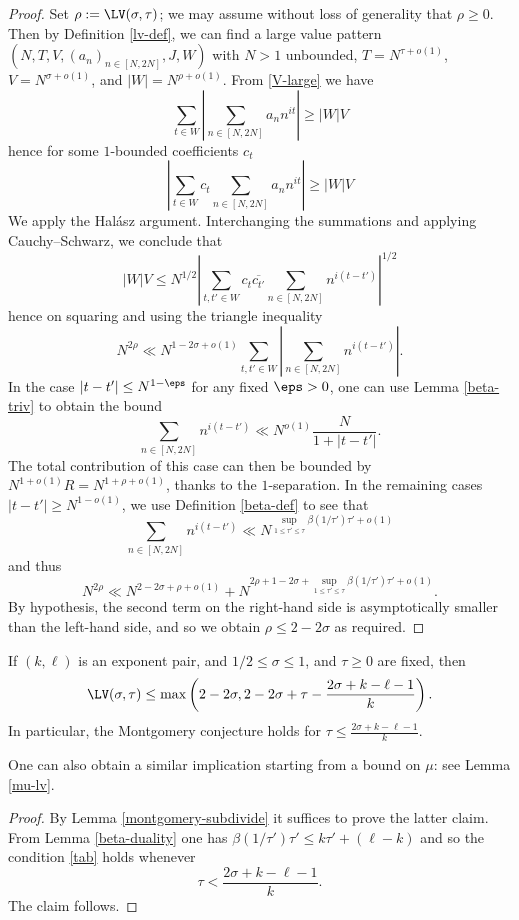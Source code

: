 \begin{proof}  Set $\rho := \LV(\sigma,\tau)$; we may assume without loss of generality that $\rho \geq 0$.  Then by Definition \ref{lv-def}, we can find a large value pattern $(N,T,V,(a_n)_{n \in [N,2N]},J,W)$  with $N > 1$ unbounded, $T = N^{\tau + o(1)}$, $V = N^{\sigma + o(1)}$, and $|W| = N^{\rho+o(1)}$.  From \eqref{V-large} we have
$$ \sum_{t \in W} \left|\sum_{n \in [N,2N]} a_n n^{it} \right| \geq |W|V$$
hence for some $1$-bounded coefficients $c_t$
$$ \left|\sum_{t \in W} c_t \sum_{n \in [N,2N]} a_n n^{it} \right| \geq |W|V$$
We apply the Hal\'asz argument. Interchanging the summations and applying Cauchy--Schwarz, we conclude that
$$ |W|V \leq N^{1/2} \left|\sum_{t, t' \in W} c_t \overline{c_{t'}} \sum_{n \in [N,2N]} n^{i(t-t')} \right|^{1/2}$$
hence on squaring and using the triangle inequality
$$ N^{2\rho} \ll N^{1-2\sigma+o(1)} \sum_{t,t' \in W} \left|\sum_{n \in [N,2N]} n^{i(t-t')} \right|.$$
In the case $|t - t'| \leq N^{1-\eps}$ for any fixed $\eps>0$, one can use Lemma \ref{beta-triv} to obtain the bound
$$ \sum_{n \in [N,2N]} n^{i(t-t')} \ll N^{o(1)} \frac{N}{1 + |t - t'|}.$$
The total contribution of this case can then be bounded by $N^{1+o(1)} R = N^{1+\rho+o(1)}$, thanks to the $1$-separation.
In the remaining cases $|t - t'| \geq N^{1-o(1)}$, we use Definition \ref{beta-def} to see that
$$ \sum_{n \in [N,2N]} n^{i(t-t')} \ll N^{\sup_{1 \leq \tau' \leq \tau} \beta(1/\tau') \tau' + o(1)}$$
and thus
$$ N^{2\rho} \ll N^{2-2\sigma+\rho+o(1)} + N^{2\rho + 1-2\sigma+\sup_{1 \leq \tau' \leq \tau} \beta(1/\tau') \tau' + o(1)}.$$
By hypothesis, the second term on the right-hand side is asymptotically smaller than the left-hand side, and so we obtain $\rho \leq 2-2\sigma$ as required.
\end{proof}

\begin{corollary}\label{exp-lv}  If $(k,\ell)$ is an exponent pair, and $1/2 \leq \sigma \leq 1$, and $\tau \geq 0$ are fixed, then
$$\LV(\sigma,\tau) \leq \max\left( 2-2\sigma, 2 - 2\sigma + \tau - \frac{2\sigma+k-\ell-1}{k} \right).$$
In particular, the Montgomery conjecture holds for $\tau \leq \frac{2\sigma+k-\ell-1}{k}$.
\end{corollary}

One can also obtain a similar implication starting from a bound on $\mu$: see Lemma \ref{mu-lv}.

\begin{proof}  By Lemma \ref{montgomery-subdivide} it suffices to prove the latter claim.  From Lemma \ref{beta-duality} one has
    $\beta(1/\tau') \tau' \leq k \tau' + (\ell-k)$
and so the condition \eqref{tab} holds whenever
$$ \tau < \frac{2\sigma+k-\ell-1}{k}.$$
The claim follows.
\end{proof}

